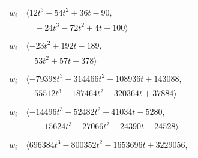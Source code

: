 \documentclass[11pt]{article}
\begin{document}
\begin{longtable}{@{}ll@{}}
$w_i$ & $\langle 12t^{3}-54t^{2}+36t-90,$\\
 & $\quad -24t^{3}-72t^{2}+4t-100\rangle$\\
\addlinespace[2pt]
\multicolumn{2}{@{}p{0.97\textwidth}@{}}{$i=13$, $D_i=1$, $\rho_{ij}$: $8{:}2, \allowbreak 9{:}2, \allowbreak 10{:}1, \allowbreak 12{:}2, \allowbreak 21{:}1, \allowbreak 23{:}2, \allowbreak 31{:}1, \allowbreak 35{:}2, \allowbreak 39{:}2, \allowbreak 40{:}1, \allowbreak 47{:}1, \allowbreak 59{:}1, \allowbreak 60{:}1, \allowbreak 61{:}1, \allowbreak 62{:}2, \allowbreak 64{:}2$}\\
$w_i$ & $\langle -23t^{2}+192t-189,$\\
 & $\quad 53t^{2}+57t-378\rangle$\\
\addlinespace[2pt]
\multicolumn{2}{@{}p{0.97\textwidth}@{}}{$i=14$, $D_i=1$, $\rho_{ij}$: $1{:}1, \allowbreak 4{:}1, \allowbreak 9{:}2, \allowbreak 26{:}2, \allowbreak 36{:}2, \allowbreak 41{:}2, \allowbreak 50{:}2, \allowbreak 59{:}1, \allowbreak 60{:}1, \allowbreak 61{:}2, \allowbreak 63{:}2$}\\
$w_i$ & $\langle -79398t^{3}-314466t^{2}-108936t+143088,$\\
 & $\quad 55512t^{3}-187464t^{2}-320364t+37884\rangle$\\
\addlinespace[2pt]
\multicolumn{2}{@{}p{0.97\textwidth}@{}}{$i=15$, $D_i=1$, $\rho_{ij}$: $4{:}2, \allowbreak 6{:}2, \allowbreak 11{:}1, \allowbreak 16{:}1, \allowbreak 17{:}2, \allowbreak 18{:}2, \allowbreak 22{:}1, \allowbreak 27{:}1, \allowbreak 33{:}1, \allowbreak 55{:}2, \allowbreak 59{:}2, \allowbreak 61{:}2$}\\
$w_i$ & $\langle -14496t^{3}-52482t^{2}-41034t-5280,$\\
 & $\quad -15624t^{3}-27066t^{2}+24390t+24528\rangle$\\
\addlinespace[2pt]
\multicolumn{2}{@{}p{0.97\textwidth}@{}}{$i=16$, $D_i=1$, $\rho_{ij}$: $0{:}2, \allowbreak 4{:}1, \allowbreak 7{:}1, \allowbreak 8{:}2, \allowbreak 9{:}1, \allowbreak 15{:}2, \allowbreak 18{:}2, \allowbreak 19{:}2, \allowbreak 22{:}2, \allowbreak 24{:}2, \allowbreak 33{:}1, \allowbreak 40{:}2, \allowbreak 41{:}2, \allowbreak 42{:}2, \allowbreak 47{:}2, \allowbreak 51{:}2, \allowbreak 53{:}2, \allowbreak 56{:}1, \allowbreak 58{:}2, \allowbreak 61{:}2, \allowbreak 64{:}2, \allowbreak 65{:}1, \allowbreak 73{:}2, \allowbreak 75{:}2, \allowbreak 77{:}1, \allowbreak 95{:}1, \allowbreak 97{:}1$}\\
$w_i$ & $\langle 696384t^{3}-800352t^{2}-1653696t+3229056,$\\

\end{longtable}
\end{document}
